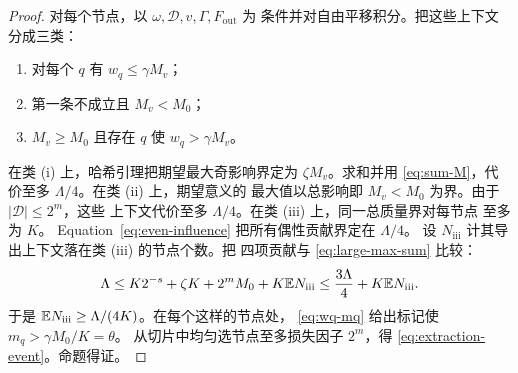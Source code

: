 \begin{proof}
对每个节点，以 $\omega,\mathcal D,v,\Gamma,F_{\mathrm{out}}$ 为
条件并对自由平移积分。把这些上下文分成三类：
\begin{enumerate}[label=(\roman*)]
\item 对每个 $q$ 有 $w_q\le\gamma M_v$；
\item 第一条不成立且 $M_v<M_0$；
\item $M_v\ge M_0$ 且存在 $q$ 使 $w_q>\gamma M_v$。
\end{enumerate}
在类 (i) 上，哈希引理把期望最大奇影响界定为 $\zeta M_v$。求和并用
\eqref{eq:sum-M}，代价至多 $\Lambda/4$。在类 (ii) 上，期望意义的
最大值以总影响即 $M_v<M_0$ 为界。由于 $|\mathcal D|\le2^m$，这些
上下文代价至多 $\Lambda/4$。在类 (iii) 上，同一总质量界对每节点
至多为 $K$。
Equation~\eqref{eq:even-influence} 把所有偶性贡献界定在 $\Lambda/4$。
设 $N_{\mathrm{iii}}$ 计其导出上下文落在类 (iii) 的节点个数。把
四项贡献与 \eqref{eq:large-max-sum} 比较：
\[
 \Lambda
 \le K2^{-s}+\zeta K+2^m M_0+K\mathbb E N_{\mathrm{iii}}
 \le\frac{3\Lambda}{4}+K\mathbb E N_{\mathrm{iii}}.
\]
于是 $\mathbb E N_{\mathrm{iii}}\ge\Lambda/(4K)$。在每个这样的节点处，
\eqref{eq:wq-mq} 给出标记使 $m_q>\gamma M_0/K=\theta$。
从切片中均匀选节点至多损失因子 $2^m$，得
\eqref{eq:extraction-event}。命题得证。
\end{proof}
